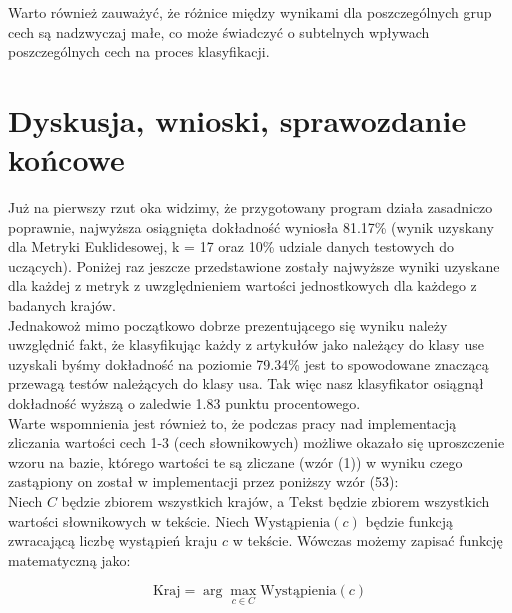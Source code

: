 \documentclass{article}
\begin{document}
\noindent Warto również zauważyć, że różnice między wynikami dla poszczególnych grup cech są nadzwyczaj małe, co może świadczyć o subtelnych wpływach poszczególnych cech na proces klasyfikacji. \\





\section{Dyskusja, wnioski, sprawozdanie końcowe}

Już na pierwszy rzut oka widzimy, że przygotowany program działa zasadniczo poprawnie, najwyższa osiągnięta dokładność wyniosła 81.17\% (wynik uzyskany dla Metryki Euklidesowej, k = 17 oraz 10\% udziale danych testowych do uczących). Poniżej raz jeszcze przedstawione zostały najwyższe wyniki uzyskane dla każdej z metryk z uwzględnieniem wartości jednostkowych dla każdego z badanych krajów. \\




\noindent Jednakowoż mimo początkowo dobrze prezentującego się wyniku należy uwzględnić fakt, że klasyfikując każdy z artykułów jako należący do klasy use uzyskali byśmy dokładność na poziomie 79.34\% jest to spowodowane znaczącą przewagą testów należących do klasy usa. Tak więc nasz klasyfikator osiągnął dokładność wyższą o zaledwie 1.83 punktu procentowego. \\

\noindent Warte wspomnienia jest również to, że podczas pracy nad implementacją zliczania wartości cech 1-3 (cech słownikowych) możliwe okazało się uproszczenie wzoru na bazie, którego wartości te są zliczane (wzór (1)) w wyniku czego zastąpiony on został w implementacji przez poniższy wzór (53): \\

\noindent Niech $C$ będzie zbiorem wszystkich krajów, a $\text{Tekst}$ będzie zbiorem wszystkich wartości słownikowych w tekście. Niech $\text{Wystąpienia}(c)$ będzie funkcją zwracającą liczbę wystąpień kraju $c$ w tekście. Wówczas możemy zapisać funkcję matematyczną jako:

\begin{equation}
\text{Kraj} = \arg\max_{c \in C} \text{Wystąpienia}(c)
\end{equation}
\end{document}
